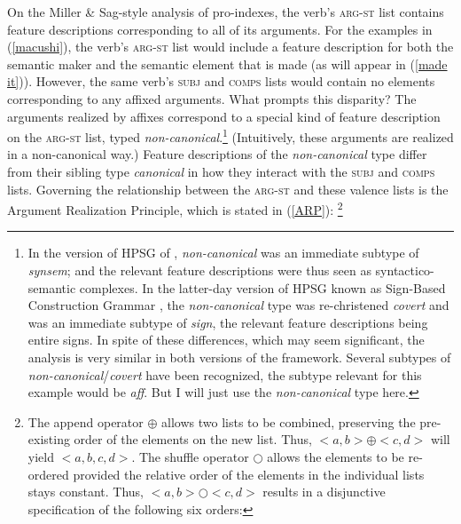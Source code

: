 \documentclass[output=paper
                ,modfonts
                ,nonflat
	        ,collection
	        ,collectionchapter
	        ,collectiontoclongg
 	        ,biblatex
                ,babelshorthands
                ,newtxmath
                ,draftmode
                ,colorlinks, citecolor=brown
]{./langsci/langscibook}
\begin{document}
{On the Miller \& Sag-style analysis of pro-indexes, the verb's \textsc{arg-st} list contains feature descriptions corresponding to all of its arguments. For the examples in (\ref{macushi}), the verb's \textsc{arg-st} list would include a feature description for both the semantic maker and the semantic element that is made (as will appear in (\ref{made it})). However, the same verb's \textsc{subj} and \textsc{comps} lists would contain no elements corresponding to any affixed arguments. What prompts this disparity? The arguments realized by affixes correspond to a special kind of feature description on the \textsc{arg-st} list, typed \textit{non-canonical}.\footnote{In the version of HPSG of \cite{GSag2000a-u}, \textit{non-canonical} was an immediate subtype of \textit{synsem}; and the relevant feature descriptions were thus seen as syntactico-semantic complexes. In the latter-day version of HPSG known as Sign-Based Construction Grammar \citep{Sag2012a}, the \textit{non-canonical} type was re-christened \textit{covert} and was an immediate subtype of \textit{sign}, the relevant feature descriptions being entire signs. In spite of these differences, which may seem significant, the analysis is very similar in both versions of the framework. Several subtypes of \textit{non-canonical}/\textit{covert} have been recognized, the subtype relevant for this example would be \textit{aff}. But I will just use the \textit{non-canonical} type here.} (Intuitively, these arguments are realized in a non-canonical way.) Feature descriptions of the \textit{non-canonical} type differ from their sibling type \textit{canonical} in how they interact with the \textsc{subj} and \textsc{comps} lists. Governing the relationship between the \textsc{arg-st} and these valence lists is the Argument Realization Principle, which is stated in (\ref{ARP}):%
	\footnote{The append operator $\oplus$ allows two lists to be combined, preserving the pre-existing order of the elements on the new list. Thus, $<a, b> \oplus <c, d >$ will yield $<a, b, c, d>$. The shuffle operator $\bigcirc$ allows the elements to be re-ordered provided the relative order of the elements in the individual lists stays constant. Thus, $<a,b> \bigcirc <c, d>$ results in a disjunctive specification of the following six orders:
	
}}
\end{document}

